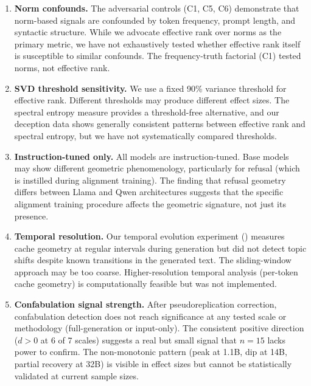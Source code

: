 \documentclass[11pt,a4paper]{article}
\begin{document}
\begin{enumerate}[leftmargin=*]
    \item \textbf{Norm confounds.} The adversarial controls (C1, C5, C6) demonstrate that norm-based signals are confounded by token frequency, prompt length, and syntactic structure. While we advocate effective rank over norms as the primary metric, we have not exhaustively tested whether effective rank itself is susceptible to similar confounds. The frequency-truth factorial (C1) tested norms, not effective rank.

    \item \textbf{SVD threshold sensitivity.} We use a fixed 90\% variance threshold for effective rank. Different thresholds may produce different effect sizes. The spectral entropy measure provides a threshold-free alternative, and our deception data shows generally consistent patterns between effective rank and spectral entropy, but we have not systematically compared thresholds.

    \item \textbf{Instruction-tuned only.} All models are instruction-tuned. Base models may show different geometric phenomenology, particularly for refusal (which is instilled during alignment training). The finding that refusal geometry differs between Llama and Qwen architectures suggests that the specific alignment training procedure affects the geometric signature, not just its presence.

    \item \textbf{Temporal resolution.} Our temporal evolution experiment () measures cache geometry at regular intervals during generation but did not detect topic shifts despite known transitions in the generated text. The sliding-window approach may be too coarse. Higher-resolution temporal analysis (per-token cache geometry) is computationally feasible but was not implemented.

    \item \textbf{Confabulation signal strength.} After pseudoreplication correction, confabulation detection does not reach significance at any tested scale or methodology (full-generation or input-only). The consistent positive direction ($d > 0$ at 6 of 7 scales) suggests a real but small signal that $n = 15$ lacks power to confirm. The non-monotonic pattern (peak at 1.1B, dip at 14B, partial recovery at 32B) is visible in effect sizes but cannot be statistically validated at current sample sizes.


\end{enumerate}
\end{document}
